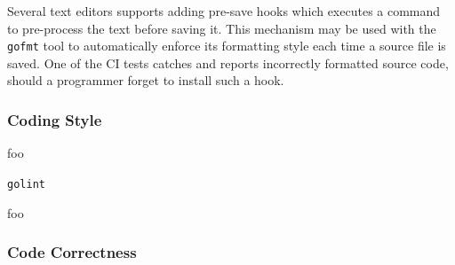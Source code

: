 Several text editors supports adding pre-save hooks which executes a command to pre-process the text before saving it. This mechanism may be used with the \texttt{gofmt} tool to automatically enforce its formatting style each time a source file is saved. One of the CI tests catches and reports incorrectly formatted source code, should a programmer forget to install such a hook.

\subsubsection{Coding Style}














foo

\texttt{golint}

%

\cite{golint}

foo

\subsubsection{Code Correctness}

